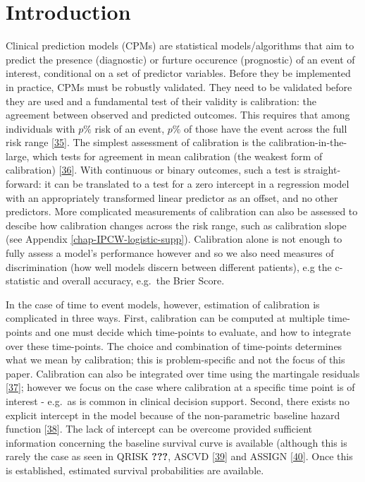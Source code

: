 \documentclass[12pt,PhD,twoside,openright]{muthesis}
\begin{document}
\hypertarget{introduction-4}{%
\section{Introduction}\label{introduction-4}}

Clinical prediction models (CPMs) are statistical models/algorithms that aim to predict the presence (diagnostic) or furture occurence (prognostic) of an event of interest, conditional on a set of predictor variables. Before they be implemented in practice, CPMs must be robustly validated. They need to be validated before they are used and a fundamental test of their validity is calibration: the agreement between observed and predicted outcomes. This requires that among individuals with \(p\%\) risk of an event, \(p\%\) of those have the event across the full risk range {[}\protect\hyperlink{ref-steyerberg_clinical_2008}{35}{]}. The simplest assessment of calibration is the calibration-in-the-large, which tests for agreement in mean calibration (the weakest form of calibration) {[}\protect\hyperlink{ref-calster_calibration_2016-1}{36}{]}. With continuous or binary outcomes, such a test is straight-forward: it can be translated to a test for a zero intercept in a regression model with an appropriately transformed linear predictor as an offset, and no other predictors. More complicated measurements of calibration can also be assessed to descibe how calibration changes across the risk range, such as calibration slope (see Appendix \ref{chap-IPCW-logistic-supp}). Calibration alone is not enough to fully assess a model's performance however and so we also need measures of discrimination (how well models discern between different patients), e.g the c-statistic and overall accuracy, e.g.~the Brier Score.

In the case of time to event models, however, estimation of calibration is complicated in three ways. First, calibration can be computed at multiple time-points and one must decide which time-points to evaluate, and how to integrate over these time-points. The choice and combination of time-points determines what we mean by calibration; this is problem-specific and not the focus of this paper. Calibration can also be integrated over time using the martingale residuals {[}\protect\hyperlink{ref-crowson_assessing_2016}{37}{]}; however we focus on the case where calibration at a specific time point is of interest - e.g.~as is common in clinical decision support. Second, there exists no explicit intercept in the model because of the non-parametric baseline hazard function {[}\protect\hyperlink{ref-royston_external_2013}{38}{]}. The lack of intercept can be overcome provided sufficient information concerning the baseline survival curve is available (although this is rarely the case as seen in QRISK {\textbf{???}}, ASCVD {[}\protect\hyperlink{ref-goff_2013_2014}{39}{]} and ASSIGN {[}\protect\hyperlink{ref-de_la_iglesia_performance_2011}{40}{]}. Once this is established, estimated survival probabilities are available.
\end{document}
